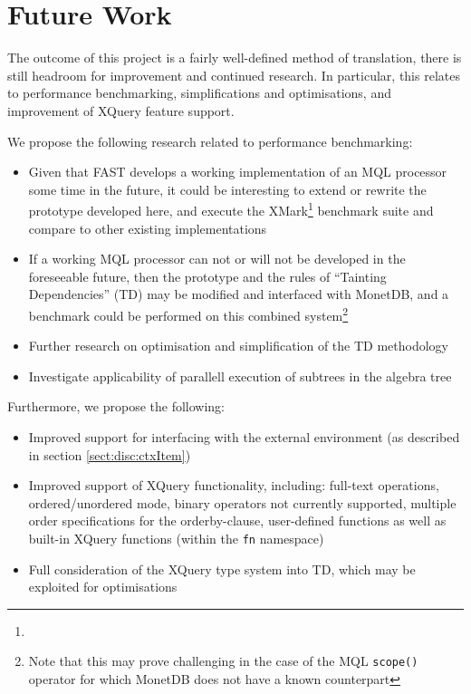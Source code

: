 \chapter{Future Work}
\label{chapter:future}
The outcome of this project is a fairly well-defined method of translation,
there is still headroom for improvement and continued research. In particular,
this relates to performance benchmarking, simplifications and optimisations,
and improvement of XQuery feature support.

We propose the following research related to performance benchmarking:
\begin{itemize}
  \item Given that FAST develops a working implementation of an MQL processor
  some time in the future, it could be interesting to extend or rewrite the
  prototype developed here, and execute the
  XMark\footnote{} 
  benchmark suite and compare to other existing implementations
  \item If a working MQL processor can not or will not be developed in the
  foreseeable future, then the prototype and the rules of ``Tainting
  Dependencies'' (TD) may be modified and interfaced with MonetDB, and a
  benchmark could be performed on this combined system\footnote{Note that this may prove challenging in the case of
  the MQL \texttt{scope()} operator for which MonetDB does not have a known
  counterpart}
  \item Further research on optimisation and simplification of the TD
  methodology
  \item Investigate applicability of parallell execution of subtrees in the
  algebra tree
\end{itemize}

Furthermore, we propose the following:
\begin{itemize}
  \item Improved support for interfacing with the external environment (as
  described in section \ref{sect:disc:ctxItem})
  \item Improved support of XQuery functionality, including: full-text
  operations, ordered/unordered mode, binary operators not currently supported,
  multiple order specifications for the orderby-clause, user-defined functions
  as well as built-in XQuery functions (within the \texttt{fn} namespace)
  \item Full consideration of the XQuery type system into TD, which may be
  exploited for optimisations
\end{itemize}